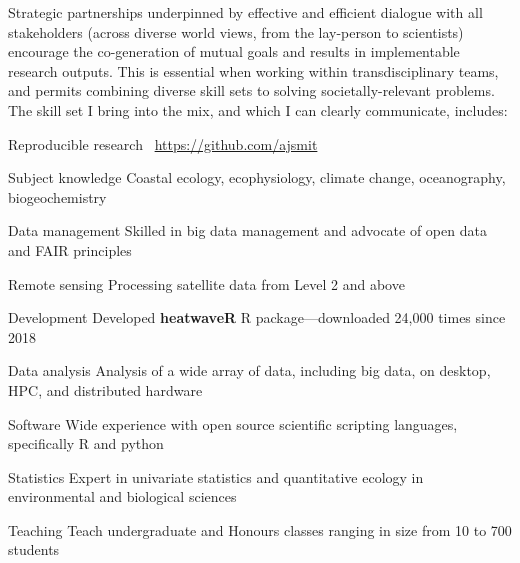 

Strategic partnerships underpinned by effective and efficient dialogue with all stakeholders (across diverse world views, from the lay-person to scientists) encourage the co-generation of mutual goals and results in implementable research outputs. This is essential when working within transdisciplinary teams, and permits combining diverse skill sets to solving societally-relevant problems. The skill set I bring into the mix, and which I can clearly communicate, includes:


\begin{cvskills}
    
    \cvskill
    {Reproducible research} %
    {\faGithub~\url{https://github.com/ajsmit}}

    \cvskill
    {Subject knowledge}
    {Coastal ecology, ecophysiology, climate change, oceanography, biogeochemistry}

    \cvskill
    {Data management} %
    {Skilled in big data management and advocate of open data and FAIR principles}
    
    \cvskill
    {Remote sensing} %
    {Processing satellite data from Level 2 and above}

    \cvskill
    {Development} %
    {Developed \textbf{heatwaveR} R package---downloaded 24,000 times since 2018}

    \cvskill
    {Data analysis} %
    {Analysis of a wide array of data, including big data, on desktop, HPC, and distributed hardware}
 
    \cvskill
    {Software} %
    {Wide experience with open source scientific scripting languages, specifically R and python}
        
    \cvskill
    {Statistics} %
    {Expert in univariate statistics and quantitative ecology in environmental and biological sciences}

    \cvskill
    {Teaching} %
    {Teach undergraduate and Honours classes ranging in size from 10 to 700 students}


\end{cvskills}